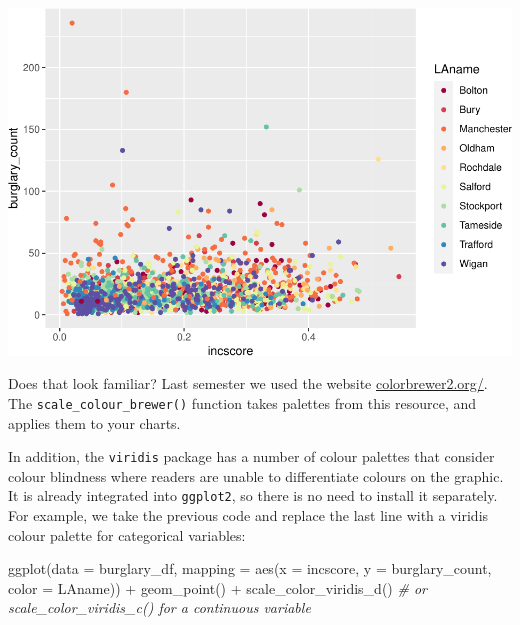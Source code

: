 \documentclass[
]{book}
\newenvironment{Shaded}{\begin{snugshade}}{\end{snugshade}}
\newcommand{\AttributeTok}[1]{\textcolor[rgb]{0.77,0.63,0.00}{#1}}
\newcommand{\CommentTok}[1]{\textcolor[rgb]{0.56,0.35,0.01}{\textit{#1}}}
\newcommand{\FunctionTok}[1]{\textcolor[rgb]{0.00,0.00,0.00}{#1}}
\newcommand{\NormalTok}[1]{#1}
\newcommand{\SpecialCharTok}[1]{\textcolor[rgb]{0.00,0.00,0.00}{#1}}
\begin{document}
\includegraphics{03-data-visualisation_files/figure-latex/unnamed-chunk-8-1.pdf}

Does that look familiar? Last semester we used the website \href{https://colorbrewer2.org/}{colorbrewer2.org/}. The \texttt{scale\_colour\_brewer()} function takes palettes from this resource, and applies them to your charts.

In addition, the \texttt{viridis} package has a number of colour palettes that consider colour blindness where readers are unable to differentiate colours on the graphic. It is already integrated into \texttt{ggplot2}, so there is no need to install it separately. For example, we take the previous code and replace the last line with a viridis colour palette for categorical variables:

\begin{Shaded}
\begin{Highlighting}[]
\FunctionTok{ggplot}\NormalTok{(}\AttributeTok{data =}\NormalTok{ burglary\_df, }\AttributeTok{mapping =} \FunctionTok{aes}\NormalTok{(}\AttributeTok{x =}\NormalTok{ incscore, }\AttributeTok{y =}\NormalTok{ burglary\_count, }\AttributeTok{color =}\NormalTok{ LAname)) }\SpecialCharTok{+} 
  \FunctionTok{geom\_point}\NormalTok{() }\SpecialCharTok{+} 
  \FunctionTok{scale\_color\_viridis\_d}\NormalTok{() }\CommentTok{\# or scale\_color\_viridis\_c() for a continuous variable }
\end{Highlighting}
\end{Shaded}
\end{document}
